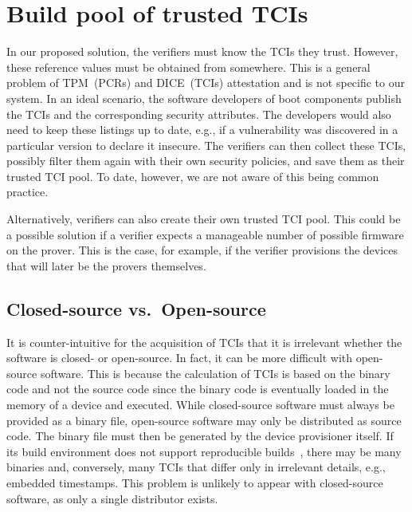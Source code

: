 \section{Build pool of trusted TCIs}

In our proposed solution, the verifiers must know the TCIs they trust.
However, these reference values must be obtained from somewhere.
This is a general problem of TPM~(PCRs) and DICE~(TCIs) attestation and is not specific to our system.
In an ideal scenario, the software developers of boot components publish the TCIs and the corresponding security attributes.
The developers would also need to keep these listings up to date, e.g., if a vulnerability was discovered in a particular version to declare it insecure.
The verifiers can then collect these TCIs, possibly filter them again with their own security policies, and save them as their trusted TCI pool.
To date, however, we are not aware of this being common practice.

Alternatively, verifiers can also create their own trusted TCI pool.
This could be a possible solution if a verifier expects a manageable number of possible firmware on the prover.
This is the case, for example, if the verifier provisions the devices that will later be the provers themselves.

\subsection{Closed-source vs.\ Open-source}

It is counter-intuitive for the acquisition of TCIs that it is irrelevant whether the software is closed- or open-source.
In fact, it can be more difficult with open-source software.
This is because the calculation of TCIs is based on the binary code and not the source code since the binary code is eventually loaded in the memory of a device and executed.
While closed-source software must always be provided as a binary file, open-source software may only be distributed as source code.
The binary file must then be generated by the device provisioner itself.
If its build environment does not support reproducible builds~\cite{Lamb2022}, there may be many binaries and, conversely, many TCIs that differ only in irrelevant details, e.g., embedded timestamps.
This problem is unlikely to appear with closed-source software, as only a single distributor exists.

